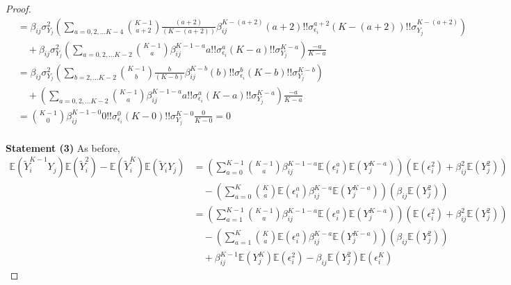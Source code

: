 \documentclass[]{article}
\newcommand{\E}{\mathbb{E}}
\begin{document}
\begin{proof}
\begin{equation}
\begin{aligned}
&= \beta_{ij}\sigma_{Y_j}^2\left(\sum_{a = 0,2,\ldots K-4}{K-1 \choose a+2}\frac{(a+2)}{(K-(a+2))} \beta_{ij}^{K- (a+2)}(a+2)!! \sigma_{\epsilon_i}^{a+2} (K-(a+2))!!\sigma_{Y_j}^{K-(a+2)}\right) 
\\
& \quad + \beta_{ij}\sigma_{Y_j}^2\left(\sum_{a = 0,2,\ldots K-2}{K-1 \choose a} \beta_{ij}^{K-1 - a}a!! \sigma_{\epsilon_i}^{a} (K-a)!!\sigma_{Y_j}^{K-a}\right)\frac{-a}{K-a}
\\
&= \beta_{ij}\sigma_{Y_j}^2\left(\sum_{b = 2,\ldots K-2}{K-1 \choose b}\frac{b}{(K-b)} \beta_{ij}^{K- b}(b)!! \sigma_{\epsilon_i}^{b} (K-b)!!\sigma_{Y_j}^{K-b}\right) 
\\
& \quad + \left(\sum_{a = 0,2,\ldots K-2}{K-1 \choose a} \beta_{ij}^{K-1 - a}a!! \sigma_{\epsilon_i}^{a} (K-a)!!\sigma_{Y_j}^{K-a}\right)\frac{-a}{K-a}\\
&= {K-1 \choose 0} \beta_{ij}^{K-1 - 0}0!! \sigma_{\epsilon_i}^{0} (K-0)!!\sigma_{Y_j}^{K-0}\frac{0}{K-0} = 0\\
\end{aligned}
\end{equation}

\textbf{Statement (3)}
As before, 
\begin{equation}
\begin{aligned}
\E(\tilde Y_i^{K-1}Y_j)\E(\tilde Y_i^2) - \E(\tilde Y_i^K)\E(\tilde Y_iY_j)
& = 
\left(\sum_{a = 0}^{K-1}{K-1 \choose a} \beta_{ij}^{K-1 - a}\E\left(\epsilon_i^a\right) \E\left(Y_j^{K-a}\right)\right) \left(\E(\epsilon_i^2)  + \beta_{ij}^2\E(Y_j^2) \right)
\\
&\quad - \left(\sum_{a = 0}^K {K \choose a} \E\left(\epsilon_i^a \right) \beta_{ij}^{K - a}\E\left(Y_j^{K - a}\right)\right)
\left(\beta_{ij}\E\left(Y_j^2\right) \right)
\\
& = 
\left(\sum_{a = 1}^{K-1}{K-1 \choose a} \beta_{ij}^{K-1 - a}\E\left(\epsilon_i^a\right) \E\left(Y_j^{K-a}\right)\right) \left(\E(\epsilon_i^2)  + \beta_{ij}^2\E(Y_j^2) \right)
\\
&\quad - \left(\sum_{a = 1}^K {K \choose a} \E\left(\epsilon_i^a \right) \beta_{ij}^{K - a}\E\left(Y_j^{K - a}\right)\right)
\left(\beta_{ij}\E\left(Y_j^2\right) \right)
\\
&\quad + \beta_{ij}^{K-1}\E(Y_j^{K})\E(\epsilon_i^2) - \beta_{ij}\E(Y_j^2)\E(\epsilon_i^K)
\end{aligned}
\end{equation}


\end{proof}
\end{document}
